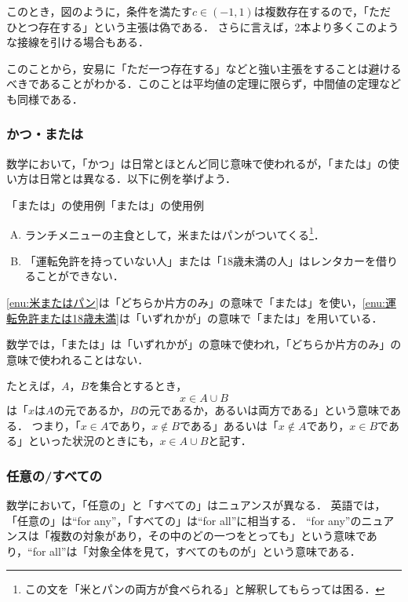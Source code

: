\documentclass[a4paper,11pt]{ltjsarticle}
\begin{document}
このとき，図のように，条件を満たす$c \in (-1,1)$は複数存在するので，「ただひとつ存在する」という主張は偽である．
さらに言えば，2本より多くこのような接線を引ける場合もある．

このことから，安易に「ただ一つ存在する」などと強い主張をすることは避けるべきであることがわかる．このことは平均値の定理に限らず，中間値の定理なども同様である．


\subsubsection{かつ・または}

数学において，「かつ」は日常とほとんど同じ意味で使われるが，「または」の使い方は日常とは異なる．以下に例を挙げよう．

\begin{example}{「または」の使用例}{「または」の使用例}
  \begin{enumerate}[(A)]
    \item ランチメニューの主食として，米またはパンがついてくる\footnote{この文を「米とパンの両方が食べられる」と解釈してもらっては困る．}．\label{enu:米またはパン}
    \item 「運転免許を持っていない人」または「18歳未満の人」はレンタカーを借りることができない． \label{enu:運転免許または18歳未満}
  \end{enumerate}
  \ref{enu:米またはパン}は「どちらか片方のみ」の意味で「または」を使い，\ref{enu:運転免許または18歳未満}は「いずれかが」の意味で「または」を用いている．
\end{example}

数学では，「または」は「いずれかが」の意味で使われ，「どちらか片方のみ」の意味で使われることはない．

たとえば，$A$，$B$を集合とするとき，
\[
  x \in A \cup B
\]
は「$x$は$A$の元であるか，$B$の元であるか，あるいは両方である」という意味である．
つまり，「$ x \in A$であり，$x \notin  B$である」あるいは「$ x \notin A$であり，$x \in B$である」といった状況のときにも，$x \in A \cup B$と記す．

\subsubsection{任意の/すべての}

数学において，「任意の」と「すべての」はニュアンスが異なる．
英語では，「任意の」は``for any''，「すべての」は``for all''に相当する．
``for any''のニュアンスは「複数の対象があり，その中のどの一つをとっても」という意味であり，``for all''は「対象全体を見て，すべてのものが」という意味である．
\end{document}
